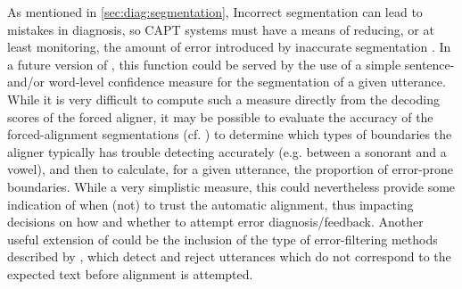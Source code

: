 
	
	
	As mentioned in \cref{sec:diag:segmentation}, 
	Incorrect segmentation can lead to mistakes in diagnosis, so CAPT systems must have a means of reducing, or at least monitoring, the amount of error introduced by inaccurate segmentation \citep{Eskenazi2009}. 
	In a future version of , this function could be served by the use of a simple sentence- and/or word-level confidence measure for the segmentation of a given utterance. 
	While it is very difficult to compute such a measure directly from the decoding scores of the forced aligner, it may be possible to evaluate the accuracy of the forced-alignment segmentations (cf. \cite{Mesbahi2011}) to determine 
	which types of boundaries the aligner typically has trouble detecting accurately (e.g. between a sonorant and a vowel), and then to calculate, for a given utterance, the proportion of error-prone boundaries. While a very simplistic measure, this could nevertheless provide some indication of when (not) to trust the automatic alignment, thus impacting decisions on how and whether to attempt error diagnosis/feedback.
	Another useful extension of  could be the inclusion of the type of error-filtering methods described by \textcite{Bonneau2012,Orosanu2012}, which detect and reject utterances which do not correspond to the expected text before alignment is attempted.
	
	
	
	
	
	
	
	
